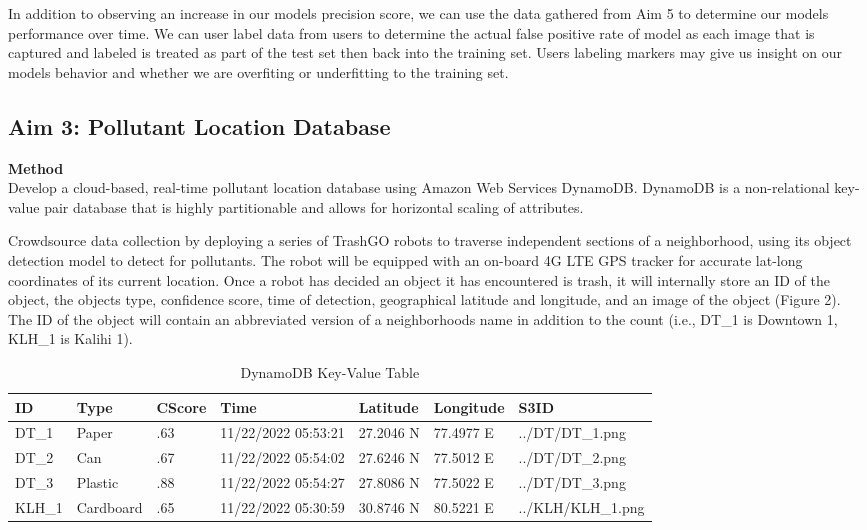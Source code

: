 \documentclass[
  journal=small,
  manuscript=article-type,  %
  year=2022,
  volume=1,
]{cup-journal}
\begin{document}
In addition to observing an increase in our models precision score, we can use the data gathered from Aim 5 to determine our models performance over time. We can user label data from users to determine the actual false positive rate of model as each image that is captured and labeled is treated as part of the test set then back into the training set. Users labeling markers may give us insight on our models behavior and whether we are overfiting or underfitting to the training set. 

\subsection{Aim 3: Pollutant Location Database}
\textbf{Method}\\
Develop a cloud-based, real-time pollutant location database using Amazon Web Services DynamoDB. DynamoDB is a non-relational key-value pair database that is highly partitionable and allows for horizontal scaling of attributes. 

Crowdsource data collection by deploying a series of TrashGO robots to traverse independent sections of a neighborhood, using its object detection model to detect for pollutants. The robot will be equipped with an on-board 4G LTE GPS tracker for accurate lat-long coordinates of its current location. Once a robot has decided an object it has encountered is trash, it will internally store an ID of the object, the objects type, confidence score, time of detection, geographical latitude and longitude, and an image of the object (Figure 2). The ID of the object will contain an abbreviated version of a neighborhoods name in addition to the count (i.e., DT\_1 is Downtown 1, KLH\_1 is Kalihi 1).

\begin{table}[h!]
    \centering
    \begin{tabular}{ | l | l | l | p{1.5cm} | l | l | l |}
    \hline
    ID & Type & CScore & Time & Latitude & Longitude & S3ID \\ \hline
    DT\_1 & Paper & .63 & 11/22/2022 05:53:21 & 27.2046 N & 77.4977 E & ../DT/DT\_1.png\\ \hline
    DT\_2 & Can & .67 & 11/22/2022 05:54:02 & 27.6246 N & 77.5012 E & ../DT/DT\_2.png\\\hline
    DT\_3 & Plastic & .88 & 11/22/2022 05:54:27 & 27.8086 N & 77.5022 E & ../DT/DT\_3.png\\\hline
    KLH\_1 & Cardboard & .65 & 11/22/2022 05:30:59 & 30.8746 N & 80.5221 E & ../KLH/KLH\_1.png\\
    \hline
    \end{tabular}
    \caption{DynamoDB Key-Value Table}
    \label{table:my_label}
\end{table}
\end{document}
